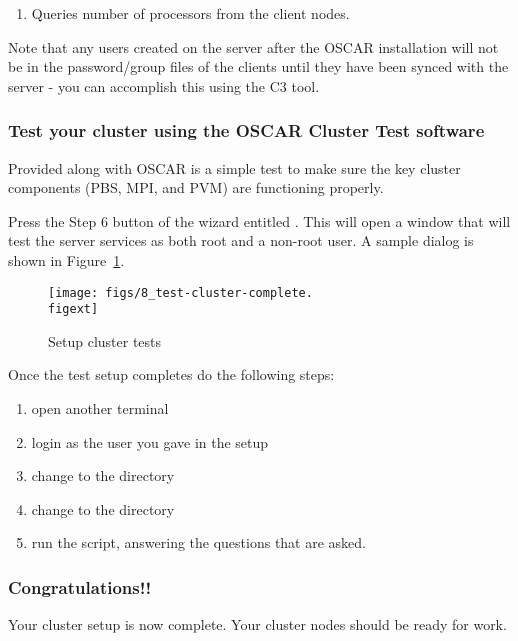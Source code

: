 \begin{enumerate}
\item Queries number of processors from the client nodes.
  
\end{enumerate}

  Note that any users created on the server after the OSCAR
  installation will not be in the password/group files of the clients
  until they have been synced with the server - you can accomplish
  this using the C3  tool.


\subsubsection{Test your cluster using the OSCAR Cluster Test
  software}
\label{det:testcluster}
            
Provided along with OSCAR is a simple test to make sure the key
cluster components (PBS, MPI, and PVM) are functioning properly. 

Press the Step 6 button of the wizard entitled . This will open a window that will test 
 the server services as both root and a non-root user. A sample dialog is shown in Figure~\ref{fig:detailed-setup-test}.


\begin{figure}[htbp]
  \begin{center}
    \texttt{[image: figs/8\_test-cluster-complete.\\figext]}
    \caption{Setup cluster tests}
    \label{fig:detailed-setup-test}
  \end{center}
\end{figure}
 
 Once the test setup completes do the following steps:
\begin{enumerate}
 \item open another terminal 
 \item login as the user you gave in the setup
 \item change to the  directory
 \item change to the  directory 
 \item run the  script, answering the questions
 that are asked.
\end{enumerate}

\subsubsection{Congratulations!!}

Your cluster setup is now complete. Your cluster nodes should
be ready for work.
